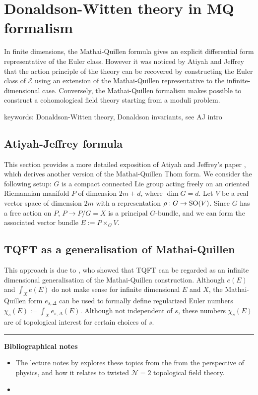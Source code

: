 \chapter{Donaldson-Witten theory in MQ formalism}
\label{chapter4}

In finite dimensions, the Mathai-Quillen formula gives an explicit differential
form representative of the Euler class. However it was noticed by Atiyah and
Jeffrey \cite{atiyahlagrangians} that the action principle of the theory can be
recovered by constructing the Euler class of $\mathcal{E}$ using an extension of
the Mathai-Quillen representative to the infinite-dimensional case. Conversely,
the Mathai-Quillen formalism makes possible to construct a cohomological field
theory starting from a moduli problem.

keywords: Donaldson-Witten theory, Donaldson invariants, see AJ intro

\section{Atiyah-Jeffrey formula}
This section provides a more detailed exposition of Atiyah and Jeffrey's paper
\cite{atiyahlagrangians}, which derives another version of the Mathai-Quillen
Thom form. We consider the following setup: $G$ is a compact connected Lie group
acting freely on an oriented Riemannian manifold  $P$ of dimension  $2m+d$,
where  $\dim G = d$. Let  $V$ be a real vector space of dimension  $2m$  with a
representation $\rho : G \to \operatorname{SO}(V)$. Since  $G$ has a free action on  $P$, 
 $P\to P /G = X$ is a principal $G$-bundle, and we can form the associated
vector bundle $E:= P\times_G V$. 



\section{TQFT as a generalisation of Mathai-Quillen}
 This approach is
due to \citet{atiyahlagrangians}, who showed that TQFT can be regarded as an
infinite dimensional generalisation of the Mathai-Quillen construction. 
Although $e(E)$ and  $\int_X e(E)$ do not make sense for
infinite dimensional  $E$ and  $X$, the Mathai-Quillen form  $e_{s,\Delta}$ can
be used to formally define regularized Euler numbers $\chi_s(E) := \int_X
e_{s,\Delta}(E)$. Although not independent of $s$, these numbers  $\chi_s(E)$
are of topological interest for certain choices of  $s$.  


\vspace{5mm}
\hrule 
\vspace{5mm}

\textbf{Bibliographical notes}
{\small
\begin{itemize}
	\item The lecture notes by \citet{cordes95} explores these topics from the
	from the perspective of physics, and how it relates to twisted
	$\mathcal{N}=2$ topological field theory.
	\item 
\end{itemize}
}


